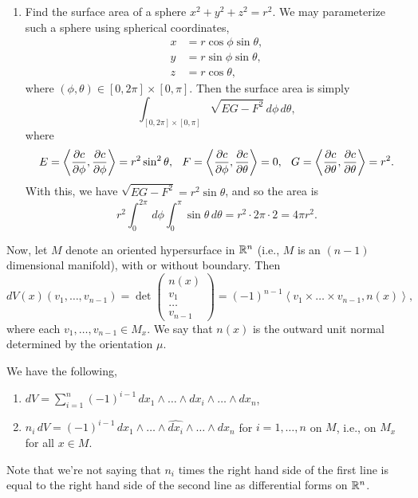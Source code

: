 \begin{enumerate}[label=(\alph*)]
    \item Find the surface area of a sphere $x^2 + y^2 + z^2 = r^2$. We may parameterize such a sphere using spherical coordinates,
    \begin{align*}
        x &= r \cos \phi \sin \theta, \\
        y &= r \sin \phi \sin \theta,  \\
        z &= r \cos \theta,
    \end{align*}
    where $(\phi, \theta) \in [0, 2\pi] \times [0, \pi]$. Then the surface area is simply
    \[ \int_{[0, 2\pi] \times [0, \pi]} \sqrt{EG - F^2} \, d\phi \, d\theta, \]
    where
    \[ E = \left<\frac{\partial c}{\partial \phi}, \frac{\partial c}{\partial \phi}\right> = r^2 \sin^2 \theta, \hspace{0.1in} F = \left<\frac{\partial c}{\partial \phi}, \frac{\partial c}{\partial \theta}\right> = 0, \hspace{0.1in} G = \left<\frac{\partial c}{\partial \theta}, \frac{\partial c}{\partial \theta}\right> = r^2. \]
    With this, we have $\sqrt{EG - F^2} = r^2 \sin \theta$, and so the area is
    \[ r^2 \int_0^{2\pi} \, d\phi \int_0^\pi \sin \theta \, d\theta = r^2 \cdot 2\pi \cdot 2 = 4\pi r^2. \]
\end{enumerate}
Now, let $M$ denote an oriented hypersurface in $\mathbb R^n$ (i.e., $M$ is an $(n-1)$ dimensional manifold), with or without boundary. Then
\[ dV(x)(v_1, \dots, v_{n-1}) = \det \begin{pmatrix} n(x) \\ v_1 \\ \dots \\ v_{n-1} \end{pmatrix} = (-1)^{n-1} \left<v_1 \times \dots \times v_{n-1}, n(x)\right>, \]
where each $v_1, \dots, v_{n-1} \in M_x$. We say that $n(x)$ is the outward unit normal determined by the orientation $\mu$.
\begin{simplelemma}
    We have the following,
    \begin{enumerate}[label=(\roman*)]
        \item $dV = \sum_{i=1}^n (-1)^{i-1} \, dx_1 \wedge \dots \wedge \widehat{dx_i} \wedge \dots \wedge dx_n$,
        \item $n_i \, dV = (-1)^{i-1} \, dx_1 \wedge \dots \wedge \widehat{dx_i} \wedge \dots \wedge dx_n$ for $i = 1, \dots, n$ on $M$, i.e., on $M_x$ for all $x \in M$.
    \end{enumerate}
    Note that we're not saying that $n_i$ times the right hand side of the first line is equal to the right hand side of the second line as differential forms on $\mathbb R^n$.
\end{simplelemma}
